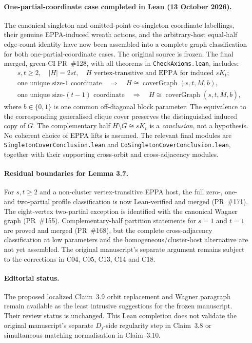 \documentclass[11pt,a4paper]{article}
\begin{document}
\paragraph{One-partial-coordinate case completed in Lean (13 October 2026).}
The canonical singleton and omitted-point co-singleton coordinate
labellings, their genuine EPPA-induced wreath actions, and the
arbitrary-host equal-half edge-count identity have now been
assembled into a complete graph classification for both
one-partial-coordinate cases. The original source is frozen.
The final merged, green-CI PR~\#128, with all
theorems in \texttt{CheckAxioms.lean}, includes:
\[
  \begin{aligned}
  &s,t\ge2,\quad |H|=2st,\quad
    H\text{ vertex-transitive and EPPA for induced }sK_t;\\
  &\text{one unique size-1 coordinate}\quad
    \Longrightarrow\quad
    H\cong\operatorname{coverGraph}(s,t,M,b),\\
  &\text{one unique size-}(t-1)\text{ coordinate}\quad
    \Longrightarrow\quad
    H\cong\operatorname{coverGraph}(s,t,\overline M,b),
  \end{aligned}
\]
where \(b\in\{0,1\}\) is one common off-diagonal block
parameter. The equivalence to the corresponding generalised
clique cover preserves the distinguished induced copy of \(G\).
The complementary half \(H\setminus G\cong sK_t\) is a
\emph{conclusion}, not a hypothesis. No coherent choice of
EPPA lifts is assumed. The relevant final modules are
\texttt{SingletonCoverConclusion.lean} and
\texttt{CoSingletonCoverConclusion.lean}, together with their
supporting cross-orbit and cross-adjacency modules.

\paragraph{Residual boundaries for Lemma 3.7.}
For \(s,t\ge2\) and a non-cluster vertex-transitive EPPA host,
the full zero-, one- and two-partial profile classification is
now Lean-verified and merged (PR~\#171). The eight-vertex
two-partial exception is identified with the canonical Wagner
graph (PR~\#155). Complementary-half partition statements for
\(s=1\) and \(t=1\) are proved and merged (PR~\#168), but the
complete cross-adjacency classification at low parameters and
the homogeneous/cluster-host alternative are not yet assembled.
The original manuscript's separate argument remains subject
to the corrections in C04, C05, C13, C14 and C18.

\paragraph{Editorial status.}
The proposed localized Claim~3.9 orbit replacement and
Wagner paragraph remain available as the least intrusive
suggestions for the frozen manuscript. Their review
status is unchanged. This Lean completion does not validate
the original manuscript's separate \(D_j\)-side
regularity step in Claim~3.8 or simultaneous matching
normalisation in Claim~3.10.
\end{document}
